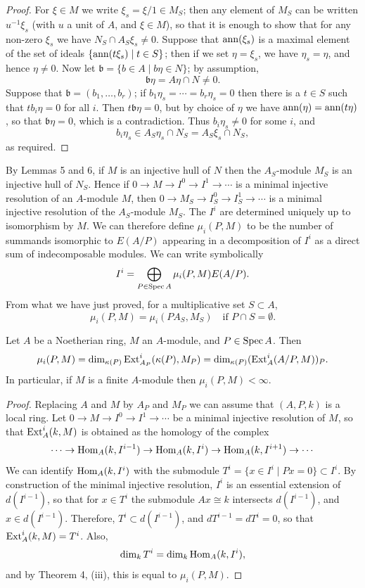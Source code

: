 \begin{proof}
For $\xi \in M$ we write $\xi_s = \xi/1 \in M_S$; then any element of $M_S$ can be written
$u^{-1}\xi_s$ (with $u$ a unit of $A$, and $\xi \in M$), so that it is enough to show that
for any non-zero $\xi_s$ we have $N_S \cap A_S\xi_s \neq 0$. Suppose that $\operatorname{ann}(\xi_s)$ is a
maximal element of the set of ideals $\{\operatorname{ann}(t\xi_s) \mid t \in S\}$; then if we set $\eta = \xi_s$,
we have $\eta_s = \eta$, and hence $\eta \neq 0$. Now let $\mathfrak{b} = \{b \in A \mid b\eta \in N\}$; by
assumption,
\[
  \mathfrak{b}\eta = A\eta \cap N \neq 0.
\]
Suppose that $\mathfrak{b} = (b_1, \ldots, b_r)$; if $b_1\eta_s = \cdots = b_r\eta_s = 0$ then there is a $t \in S$
such that $tb_i\eta = 0$ for all $i$. Then $t\mathfrak{b}\eta = 0$, but by choice of $\eta$ we have
$\operatorname{ann}(\eta) = \operatorname{ann}(t\eta)$, so that $\mathfrak{b}\eta = 0$, which is a contradiction. Thus $b_i\eta_s \neq 0$
for some $i$, and
\[
  b_i\eta_s \in A_S\eta_s \cap N_S = A_S\xi_s \cap N_S,
\]
as required.
\end{proof}

By Lemmas 5 and 6, if $M$ is an injective hull of $N$ then the $A_S$-module
$M_S$ is an injective hull of $N_S$. Hence if $0 \to M \to I^0 \to I^1 \to \cdots$ is
a minimal injective resolution of an $A$-module $M$, then $0 \to M_S \to I^0_S \to
I^1_S \to \cdots$ is a minimal injective resolution of the $A_S$-module $M_S$. The
$I^i$ are determined uniquely up to isomorphism by $M$. We can therefore
define $\mu_i(P, M)$ to be the number of summands isomorphic to $E(A/P)$
appearing in a decomposition of $I^i$ as a direct sum of indecomposable
modules. We can write symbolically
\[
  I^i = \bigoplus_{P \in \operatorname{Spec} A} \mu_i(P, M)E(A/P).
\]
From what we have just proved, for a multiplicative set $S \subset A$,
\[
  \mu_i(P, M) = \mu_i(PA_S, M_S) \quad \text{if } P \cap S = \emptyset.
\]

\begin{theorem}\label{thm:18.7}
Let $A$ be a Noetherian ring, $M$ an $A$-module, and
$P \in \operatorname{Spec} A$. Then
\[
  \mu_i(P, M) = \dim_{\kappa(P)} \operatorname{Ext}^i_{A_P}(\kappa(P), M_P) = \dim_{\kappa(P)}(\operatorname{Ext}^i_A(A/P, M))_P.
\]
In particular, if $M$ is a finite $A$-module then $\mu_i(P, M) < \infty$.
\end{theorem}

\begin{proof}
Replacing $A$ and $M$ by $A_P$ and $M_P$ we can assume that $(A, P, k)$ is
a local ring. Let $0 \to M \to I^0 \to I^1 \to \cdots$ be a minimal injective
resolution of $M$, so that $\operatorname{Ext}^i_A(k, M)$ is obtained as the homology of the
complex
\[
  \cdots \to \operatorname{Hom}_A(k, I^{i-1}) \to \operatorname{Hom}_A(k, I^i) \to \operatorname{Hom}_A(k, I^{i+1})
  \to \cdots
\]
We can identify $\operatorname{Hom}_A(k, I^i)$ with the submodule $T^i = \{x \in I^i \mid Px = 0\} \subset
I^i$. By construction of the minimal injective resolution, $I^i$ is an essential
extension of $d(I^{i-1})$, so that for $x \in T^i$ the submodule $Ax \cong k$ intersects
$d(I^{i-1})$, and $x \in d(I^{i-1})$. Therefore, $T^i \subset d(I^{i-1})$, and $dT^{i-1} = dT^i = 0$, so
that $\operatorname{Ext}^i_A(k, M) = T^i$. Also,
\[
  \dim_k T^i = \dim_k \operatorname{Hom}_A(k, I^i),
\]
and by Theorem 4, (iii), this is equal to $\mu_i(P, M)$.
\end{proof}

